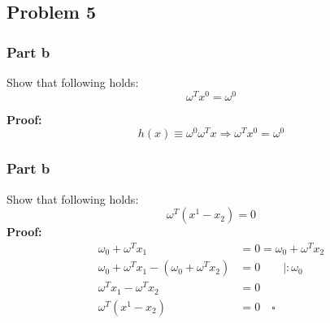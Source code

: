 \subsection*{Problem 5}
\subsubsection*{Part b}
Show that following holds:
\begin{equation*}
\omega^{T}x^{0}=\omega^{0}
\end{equation*}

\textbf{Proof:}
\begin{equation*}
h(x)\equiv\omega^{0}\omega^{T}x\Rightarrow \omega^{T}x^{0}=\omega^{0}
\end{equation*}
\subsubsection*{Part b}
Show that following holds:
\begin{equation*}
\omega^{T}(x^{1}-x_{2})=0
\end{equation*}
\textbf{Proof:}
\begin{align*}
\omega_{0}+\omega^{T}x_{1}	&=0=\omega_{0}+\omega^{T}x_{2}\\
\omega_{0}+\omega^{T}x_{1}-(\omega_{0}+\omega^{T}x_{2})&=0\qquad\mid :\omega_{0}\\
\omega^{T}x_{1}-\omega^{T}x_{2}&=0\\
\omega^{T}(x^{1}-x_{2})&=0\quad\square
\end{align*}